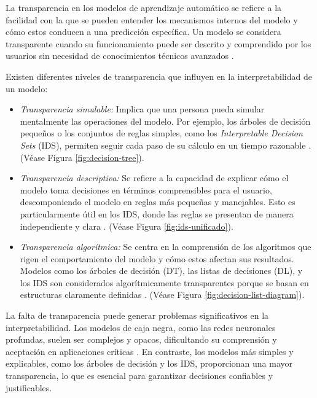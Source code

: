 La transparencia en los modelos de aprendizaje automático se refiere a la facilidad con la que se pueden entender los mecanismos internos del modelo y cómo estos conducen a una predicción específica. Un modelo se considera transparente cuando su funcionamiento puede ser descrito y comprendido por los usuarios sin necesidad de conocimientos técnicos avanzados \cite{Rudin-2019}.

Existen diferentes niveles de transparencia que influyen en la interpretabilidad de un modelo:

\begin{itemize}
    \item \textit{Transparencia simulable:} Implica que una persona pueda simular mentalmente las operaciones del modelo. Por ejemplo, los árboles de decisión pequeños o los conjuntos de reglas simples, como los \textit{Interpretable Decision Sets} (IDS), permiten seguir cada paso de su cálculo en un tiempo razonable \cite{Kaur-2020}. (Véase Figura \ref{fig:decision-tree}).

    \item \textit{Transparencia descriptiva:} Se refiere a la capacidad de explicar cómo el modelo toma decisiones en términos comprensibles para el usuario, descomponiendo el modelo en reglas más pequeñas y manejables. Esto es particularmente útil en los IDS, donde las reglas se presentan de manera independiente y clara \cite{lakkaraju-2016}. (Véase Figura \ref{fig:ids-unificado}).

    \item \textit{Transparencia algorítmica:} Se centra en la comprensión de los algoritmos que rigen el comportamiento del modelo y cómo estos afectan sus resultados. Modelos como los árboles de decisión (DT), las listas de decisiones (DL), y los IDS son considerados algorítmicamente transparentes porque se basan en estructuras claramente definidas \cite{Breiman-1984}. (Véase Figura \ref{fig:decision-list-diagram}).
\end{itemize}

La falta de transparencia puede generar problemas significativos en la interpretabilidad. Los modelos de caja negra, como las redes neuronales profundas, suelen ser complejos y opacos, dificultando su comprensión y aceptación en aplicaciones críticas \cite{samek-2019}. En contraste, los modelos más simples y explicables, como los árboles de decisión y los IDS, proporcionan una mayor transparencia, lo que es esencial para garantizar decisiones confiables y justificables.

